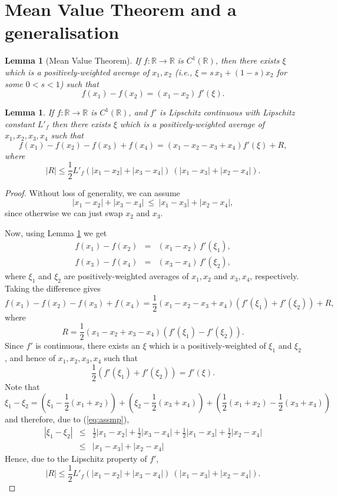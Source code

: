 \documentclass[11pt]{article}
\def \RR {{\mathbb{R}}}
\newcommand{\fracs}[2]{{\textstyle \frac{#1}{#2}}}
\newtheorem{lemma}[theorem]{Lemma}
\begin{document}



\appendix

\newpage
\section{Mean Value Theorem and a generalisation}

\begin{lemma}[Mean Value Theorem]
\label{lemma:MVT}
If $f: \RR \rightarrow \RR$ is $C^1(\RR)$, then there exists 
$\xi$ which is a positively-weighted average of $x_1, x_2$
(i.e., $\xi = s\, x_1 + (1{-}s) x_2$ for some $0\!<\!s\!<\!1$)
such that
\[
f(x_1) - f(x_2) = (x_1{-}x_2) \, f'(\xi).
\]
\end{lemma}

\begin{lemma}
\label{lemma:MVT2}
If $f: \RR \rightarrow \RR$ is $C^1(\RR)$, and $f'$ is Lipschitz 
continuous with Lipschitz constant $L'_f$ then there exists $\xi$ 
which is a positively-weighted average of $x_1, x_2, x_3, x_4$ such
that
\[
f(x_1) - f(x_2) - f(x_3) + f(x_4) = 
(x_1 - x_2 - x_3 + x_4) f'(\xi) + R,
\]
where
\[
|R| \leq \fracs{1}{2} L'_f (|x_1{-}x_2| + |x_3{-}x_4|)\ (|x_1{-}x_3| + |x_2{-}x_4|).
\]
\end{lemma}
\begin{proof}
Without loss of generality, we can assume 
\begin{equation}
|x_1{-}x_2| + |x_3{-}x_4|\ \leq\ |x_1{-}x_3| + |x_2{-}x_4|,
\label{eq:assmp}
\end{equation}
since otherwise we can just swap $x_2$ and $x_3$.

Now, using Lemma \ref{lemma:MVT} we get
\begin{eqnarray*}
f(x_1) - f(x_2) &{=}& (x_1{-}x_2) \, f'(\xi_1),\\
f(x_3) - f(x_4) &{=}& (x_3{-}x_4) \, f'(\xi_2),
\end{eqnarray*}
where $\xi_1$ and $\xi_2$ are positively-weighted averages 
of $x_1, x_2$ and $x_3, x_4$, respectively.
Taking the difference gives
\[
f(x_1) - f(x_2) - f(x_3) + f(x_4) = 
  \fracs{1}{2} (x_1 {-} x_2 {-} x_3 {+} x_4)  (f'(\xi_1) {+} f'(\xi_2)) + R,
\]
where
\[
R = \fracs{1}{2} (x_1 {-} x_2 {+} x_3 {-} x_4)  (f'(\xi_1) {-} f'(\xi_2)).
\]
Since $f'$ is continuous, there exists an $\xi$ which is a positively-weighted
of $\xi_1$ and $\xi_2$, and hence of $x_1, x_2, x_3, x_4$ such that
\[
\fracs{1}{2}  (f'(\xi_1) + f'(\xi_2)) = f'(\xi).
\]
Note that
\[
\xi_1 - \xi_2 = (\xi_1 - \fracs{1}{2}(x_1+x_2)) + (\xi_2 - \fracs{1}{2}(x_3+x_4))
+ ( \fracs{1}{2}(x_1+x_2) - \fracs{1}{2}(x_3+x_4) )
\]
and therefore, due to (\ref{eq:assmp}),
\begin{eqnarray*}
| \xi_1 - \xi_2 | 
&\leq& \fracs{1}{2}|x_1-x_2| + \fracs{1}{2}|x_3-x_4| + \fracs{1}{2}|x_1-x_3| + \fracs{1}{2}|x_2-x_4|\\
&\leq& |x_1-x_3| + |x_2-x_4|
\end{eqnarray*}
Hence, due to the Lipschitz property of $f'$, 
\[
|R| \leq \fracs{1}{2} L'_f (|x_1{-}x_2| + |x_3{-}x_4|)\ (|x_1{-}x_3| + |x_2{-}x_4|).
\]
\end{proof}
\end{document}
